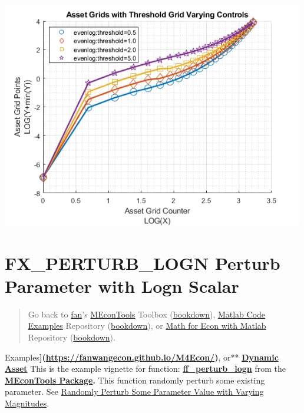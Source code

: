\documentclass[
]{book}
\begin{document}
\includegraphics[width=5.20833in,height=\textheight]{img/fx_saveborr_grid_images/figure_7.png}

\hypertarget{fx_perturb_logn-perturb-parameter-with-logn-scalar}{%
\section{FX\_PERTURB\_LOGN Perturb Parameter with Logn Scalar}\label{fx_perturb_logn-perturb-parameter-with-logn-scalar}}

\begin{quote}
Go back to \href{http://fanwangecon.github.io/}{fan}'s \href{https://fanwangecon.github.io/MEconTools/}{MEconTools} Toolbox (\href{https://fanwangecon.github.io/MEconTools/bookdown}{bookdown}), \href{https://fanwangecon.github.io/M4Econ/}{Matlab Code Examples} Repository (\href{https://fanwangecon.github.io/M4Econ/bookdown}{bookdown}), or \href{https://fanwangecon.github.io/Math4Econ/}{Math for Econ with Matlab} Repository (\href{https://fanwangecon.github.io/Math4Econ/bookdown}{bookdown}).
\end{quote}

Examples\textbf{{]}(\url{https://fanwangecon.github.io/M4Econ/})}, or** \href{https://fanwangecon.github.io/CodeDynaAsset/}{\textbf{Dynamic
Asset}}
This is the example vignette for function:
\href{https://github.com/FanWangEcon/MEconTools/blob/master/MEconTools/generate/ff_perturb_logn.m}{\textbf{ff\_perturb\_logn}}
from the \href{https://fanwangecon.github.io/MEconTools/}{\textbf{MEconTools
Package}}\textbf{.} This function
randomly perturb some existing parameter. See \href{https://fanwangecon.github.io/R4Econ/statistics/random/htmlpdfr/fs_perturb_parameter.html}{Randomly Perturb Some
Parameter Value with Varying
Magnitudes}.
\end{document}
